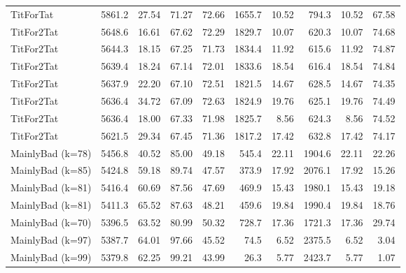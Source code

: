 \documentclass[journal,10pt,twoside]{IEEEtran}
\begin{document}
\begin{table}[ht]
\begin{tabular}{l|rrrr|rrrrr}
		TitForTat         & 5861.2 &  27.54 &  71.27 &   72.66 & 1655.7 &                  10.52 &  794.3 &                   10.52 &    67.58 \\
		TitFor2Tat        & 5648.6 &  16.61 &  67.62 &   72.29 & 1829.7 &                  10.07 &  620.3 &                   10.07 &    74.68 \\
		TitFor2Tat        & 5644.3 &  18.15 &  67.25 &   71.73 & 1834.4 &                  11.92 &  615.6 &                   11.92 &    74.87 \\
		TitFor2Tat        & 5639.4 &  18.24 &  67.14 &   72.01 & 1833.6 &                  18.54 &  616.4 &                   18.54 &    74.84 \\
		TitFor2Tat        & 5637.9 &  22.20 &  67.10 &   72.51 & 1821.5 &                  14.67 &  628.5 &                   14.67 &    74.35 \\
		TitFor2Tat        & 5636.4 &  34.72 &  67.09 &   72.63 & 1824.9 &                  19.76 &  625.1 &                   19.76 &    74.49 \\
		TitFor2Tat        & 5636.4 &  18.00 &  67.33 &   71.98 & 1825.7 &                   8.56 &  624.3 &                    8.56 &    74.52 \\
		TitFor2Tat        & 5621.5 &  29.34 &  67.45 &   71.36 & 1817.2 &                  17.42 &  632.8 &                   17.42 &    74.17 \\
		MainlyBad (k=78)  & 5456.8 &  40.52 &  85.00 &   49.18 &  545.4 &                  22.11 & 1904.6 &                   22.11 &    22.26 \\
		MainlyBad (k=85)  & 5424.8 &  59.18 &  89.74 &   47.57 &  373.9 &                  17.92 & 2076.1 &                   17.92 &    15.26 \\
		MainlyBad (k=81)  & 5416.4 &  60.69 &  87.56 &   47.69 &  469.9 &                  15.43 & 1980.1 &                   15.43 &    19.18 \\
		MainlyBad (k=81)  & 5411.3 &  65.52 &  87.63 &   48.21 &  459.6 &                  19.84 & 1990.4 &                   19.84 &    18.76 \\
		MainlyBad (k=70)  & 5396.5 &  63.52 &  80.99 &   50.32 &  728.7 &                  17.36 & 1721.3 &                   17.36 &    29.74 \\
		MainlyBad (k=97)  & 5387.7 &  64.01 &  97.66 &   45.52 &   74.5 &                   6.52 & 2375.5 &                    6.52 &     3.04 \\
		MainlyBad (k=99)  & 5379.8 &  62.25 &  99.21 &   43.99 &   26.3 &                   5.77 & 2423.7 &                    5.77 &     1.07 \\

\end{tabular}
\end{table}
\end{document}
